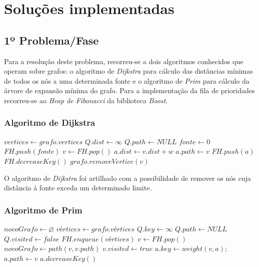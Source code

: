 \documentclass[a4paper,12pt,titlepage]{article}
\begin{document}
\section{Soluções implementadas}
\subsection{1º Problema/Fase}
Para a resolução deste problema, recorreu-se a dois algoritmos conhecidos que operam sobre grafos: o algoritmo de \emph{Dijkstra} para cálculo das distâncias mínimas de todos os nós a uma determinada fonte e o algoritmo de \emph{Prim} para cálculo da árvore de expansão mínima do grafo. Para a implementação da fila de prioridades recorreu-se ao \emph{Heap de Fibonacci} da biblioteca \emph{Boost}. 
\subsubsection{Algoritmo de Dijkstra}

\begin{algorithmic}[1]
\State $vertices \gets grafo.vertices$
\State $Q.dist \gets \infty$
\State $Q.path \gets NULL$
\EndFor
\State $fonte \gets 0$
\State $FH.push(fonte)$
\State $v \gets FH.pop()$
	\State $a.dist \gets v.dist + w$
	\State $a.path \gets v$
		\State $FH.push(a)$
	\Else
		\State $FH.decreaseKey()$
	\EndIf
\EndIf
\EndFor
\EndWhile
\EndProcedure
{}
\State $grafo.removeVertice(v)$
\EndIf
\EndFor
\EndProcedure
\end{algorithmic}

O algoritmo de \emph{Dijkstra} foi artilhado com a possibilidade de remover os nós cuja distância à fonte exceda um determinado limite.

\subsubsection{Algoritmo de Prim}
\begin{algorithmic}[1]
\State $novoGrafo \gets \varnothing$
\State $vértices \gets grafo.vértices$
\State $Q.key \gets \infty$
\State $Q.path \gets NULL$
\State $Q.visited \gets false$
\EndFor
\State $FH.enqueue(vértices)$
\State $v \gets FH.pop()$
\State $novoGrafo \gets path(v, v.path)$
\State $v.visited \gets true$
\State $a.key \gets weight(v,a)$;
\State $a.path \gets v$
\State $a.decreaseKey()$
\EndIf
\EndFor
\EndWhile
\EndProcedure

\end{algorithmic}
\end{document}

